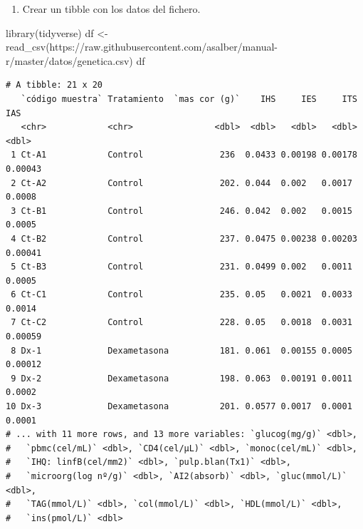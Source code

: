 \documentclass[
  a4paper,
]{scrreport}
\newenvironment{Shaded}{\begin{snugshade}}{\end{snugshade}}
\newcommand{\FunctionTok}[1]{\textcolor[rgb]{0.28,0.35,0.67}{#1}}
\newcommand{\NormalTok}[1]{\textcolor[rgb]{0.00,0.23,0.31}{#1}}
\newcommand{\OtherTok}[1]{\textcolor[rgb]{0.00,0.23,0.31}{#1}}
\newcommand{\StringTok}[1]{\textcolor[rgb]{0.13,0.47,0.30}{#1}}
\providecommand{\tightlist}{%
  \setlength{\itemsep}{0pt}\setlength{\parskip}{0pt}}\usepackage{longtable,booktabs,array}
\theoremstyle{definition}
\theoremstyle{definition}
\theoremstyle{remark}
\begin{document}
\begin{enumerate}
\def\labelenumi{\alph{enumi}.}
\tightlist
\item
  Crear un tibble con los datos del fichero.
\end{enumerate}

\begin{tcolorbox}[enhanced jigsaw, rightrule=.15mm, titlerule=0mm, colbacktitle=quarto-callout-note-color!10!white, toprule=.15mm, coltitle=black, bottomtitle=1mm, opacityback=0, toptitle=1mm, title=\textcolor{quarto-callout-note-color}{\faInfo}\hspace{0.5em}{Solución}, left=2mm, colback=white, breakable, colframe=quarto-callout-note-color-frame, leftrule=.75mm, opacitybacktitle=0.6, arc=.35mm, bottomrule=.15mm]

\begin{Shaded}
\begin{Highlighting}[]
\FunctionTok{library}\NormalTok{(tidyverse)}
\NormalTok{df }\OtherTok{\textless{}{-}} \FunctionTok{read\_csv}\NormalTok{(}\StringTok{\textquotesingle{}https://raw.githubusercontent.com/asalber/manual{-}r/master/datos/genetica.csv\textquotesingle{}}\NormalTok{)}
\NormalTok{df}
\end{Highlighting}
\end{Shaded}

\begin{verbatim}
# A tibble: 21 x 20
   `código muestra` Tratamiento  `mas cor (g)`    IHS     IES     ITS     IAS
   <chr>            <chr>                <dbl>  <dbl>   <dbl>   <dbl>   <dbl>
 1 Ct-A1            Control               236  0.0433 0.00198 0.00178 0.00043
 2 Ct-A2            Control               202. 0.044  0.002   0.0017  0.0008 
 3 Ct-B1            Control               246. 0.042  0.002   0.0015  0.0005 
 4 Ct-B2            Control               237. 0.0475 0.00238 0.00203 0.00041
 5 Ct-B3            Control               231. 0.0499 0.002   0.0011  0.0005 
 6 Ct-C1            Control               235. 0.05   0.0021  0.0033  0.0014 
 7 Ct-C2            Control               228. 0.05   0.0018  0.0031  0.00059
 8 Dx-1             Dexametasona          181. 0.061  0.00155 0.0005  0.00012
 9 Dx-2             Dexametasona          198. 0.063  0.00191 0.0011  0.0002 
10 Dx-3             Dexametasona          201. 0.0577 0.0017  0.0001  0.0001 
# ... with 11 more rows, and 13 more variables: `glucog(mg/g)` <dbl>,
#   `pbmc(cel/mL)` <dbl>, `CD4(cel/µL)` <dbl>, `monoc(cel/mL)` <dbl>,
#   `IHQ: linfB(cel/mm2)` <dbl>, `pulp.blan(Tx1)` <dbl>,
#   `microorg(log nº/g)` <dbl>, `AI2(absorb)` <dbl>, `gluc(mmol/L)` <dbl>,
#   `TAG(mmol/L)` <dbl>, `col(mmol/L)` <dbl>, `HDL(mmol/L)` <dbl>,
#   `ins(pmol/L)` <dbl>
\end{verbatim}

\end{tcolorbox}
\end{document}
